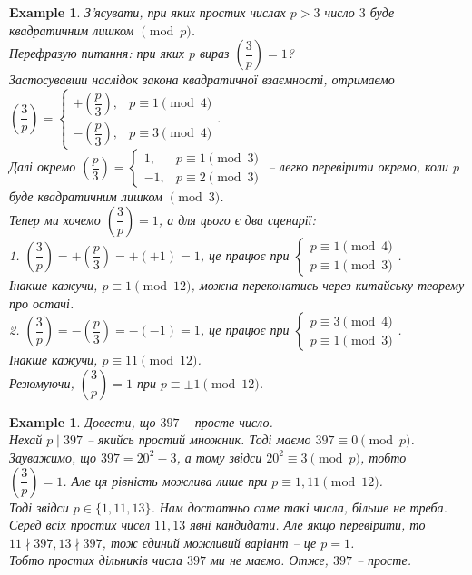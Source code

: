\documentclass[a4paper, 14pt]{extarticle}
\theoremstyle{theoremdd}
\theoremstyle{theoremdd}
\theoremstyle{theoremdd}
\theoremstyle{theoremdd}
\newtheorem{example}[theorem]{Example}
\theoremstyle{theoremdd}
\theoremstyle{theoremdd}
\theoremstyle{theoremdd}
\theoremstyle{theoremdd}
\begin{document}
\begin{example}
З'ясувати, при яких простих числах $p>3$ число $3$ буде квадратичним лишком $\pmod p$.\\
Перефразую питання: при яких $p$ вираз $\left( \dfrac{3}{p} \right) = 1$?\\
Застосувавши наслідок закона квадратичної взаємності, отримаємо\\
$\left( \dfrac{3}{p} \right) = \begin{cases} +\left( \dfrac{p}{3} \right), & p \equiv 1 \pmod 4 \\ -\left(\dfrac{p}{3}\right), & p \equiv 3 \pmod 4 \end{cases}$.\\
Далі окремо $\left( \dfrac{p}{3} \right) = \begin{cases} 1, & p \equiv 1 \pmod 3 \\ -1, & p \equiv 2 \pmod 3 \end{cases}$ -- легко перевірити окремо, коли $p$ буде квадратичним лишком $\pmod 3$.\\
Тепер ми хочемо $\left( \dfrac{3}{p} \right) = 1$, а для цього є два сценарії:\\
1. $\left( \dfrac{3}{p} \right) = +\left( \dfrac{p}{3} \right) = +(+1) = 1$, це працює при $\begin{cases} p \equiv 1 \pmod 4 \\ p \equiv 1 \pmod 3 \end{cases}$.\\ Інакше кажучи, $p \equiv 1 \pmod {12}$, можна переконатись через китайську теорему про остачі.\\
2. $\left( \dfrac{3}{p} \right) = -\left( \dfrac{p}{3} \right) = -(-1) = 1$, це працює при $\begin{cases} p \equiv 3 \pmod 4 \\ p \equiv 1 \pmod 3 \end{cases}$. \\Інакше кажучи, $p \equiv 11 \pmod {12}$.\\
Резюмуючи, $\left( \dfrac{3}{p} \right) = 1$ при $p \equiv \pm 1 \pmod {12}$.
\end{example}

\begin{example}
Довести, що $397$ -- просте число.\\
Нехай $p \mid 397$ -- якийсь простий множник. Тоді маємо $397 \equiv 0 \pmod p$.\\
Зауважимо, що $397 = 20^2-3$, а тому звідси $20^2 \equiv 3 \pmod p$, тобто\\
$\left( \dfrac{3}{p} \right) = 1$. Але ця рівність можлива лише при $p \equiv 1,11 \pmod {12}$.\\
Тоді звідси $p \in \{1,11,13\}$. Нам достатньо саме такі числа, більше не треба. Серед всіх простих чисел $11,13$ явні кандидати. Але якщо перевірити, то $11 \nmid 397, 13 \nmid 397$, тож єдиний можливий варіант -- це $p = 1$.\\
Тобто простих дільників числа $397$ ми не маємо. Отже, $397$ -- просте.
\end{example}
\end{document}
